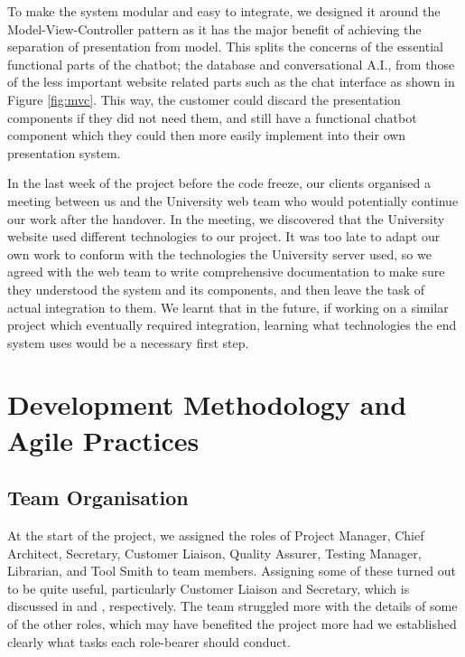 \documentclass{l3proj}
\begin{document}
To make the system modular and easy to integrate, we designed it around the Model-View-Controller pattern as it has the major benefit of achieving the separation of presentation from model\cite{patterns:Fowler}. This splits the concerns of the essential functional parts of the chatbot; the database and conversational A.I., from those of the less important website related parts such as the chat interface as shown in Figure \ref{fig:mvc}. This way, the customer could discard the presentation components if they did not need them, and still have a functional chatbot component which they could then more easily implement into their own presentation system.

In the last week of the project before the code freeze, our clients organised a meeting between us and the University web team who would potentially continue our work after the handover. In the meeting, we discovered that the University website used different technologies to our project. It was too late to adapt our own work to conform with the technologies the University server used, so we agreed with the web team to write comprehensive documentation to make sure they understood the system and its components, and then leave the task of actual integration to them. We learnt that in the future, if working on a similar project which eventually required integration, learning what technologies the end system uses would be a necessary first step.



\section{Development Methodology and Agile Practices}
\label{sec:methodology}

\subsection{Team Organisation}

At the start of the project, we assigned the roles of Project Manager, Chief Architect, Secretary, Customer Liaison, Quality Assurer, Testing Manager, Librarian, and Tool Smith to team members. Assigning some of these turned out to be quite useful, particularly Customer Liaison and Secretary, which is discussed in  and , respectively. The team struggled more with the details of some of the other roles, which may have benefited the project more had we established clearly what tasks each role-bearer should conduct.
\end{document}
